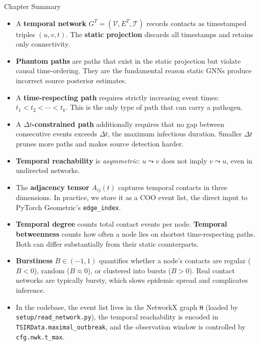 \begin{conceptbox}{Chapter Summary}
\begin{itemize}
  \item A \textbf{temporal network} $G^T = (\mathcal{V}, E^T, \mathcal{T})$ records contacts
        as timestamped triples $(u, v, t)$. The \textbf{static projection} discards all
        timestamps and retains only connectivity.
  \item \textbf{Phantom paths} are paths that exist in the static projection but violate
        causal time-ordering. They are the fundamental reason static GNNs produce incorrect
        source posterior estimates.
  \item A \textbf{time-respecting path} requires strictly increasing event times:
        $t_1 < t_2 < \cdots < t_k$. This is the only type of path that can carry a pathogen.
  \item A \textbf{$\Delta t$-constrained path} additionally requires that no gap between
        consecutive events exceeds $\Delta t$, the maximum infectious duration. Smaller
        $\Delta t$ prunes more paths and makes source detection harder.
  \item \textbf{Temporal reachability} is \textit{asymmetric}: $u \leadsto v$ does not imply
        $v \leadsto u$, even in undirected networks.
  \item The \textbf{adjacency tensor} $A_{ij}(t)$ captures temporal contacts in three
        dimensions. In practice, we store it as a COO event list, the direct input to
        PyTorch Geometric's \texttt{edge\_index}.
  \item \textbf{Temporal degree} counts total contact events per node.
        \textbf{Temporal betweenness} counts how often a node lies on shortest
        time-respecting paths. Both can differ substantially from their static counterparts.
  \item \textbf{Burstiness} $B \in (-1, 1)$ quantifies whether a node's contacts are regular
        ($B < 0$), random ($B \approx 0$), or clustered into bursts ($B > 0$). Real contact
        networks are typically bursty, which slows epidemic spread and complicates inference.
  \item In the codebase, the event list lives in the NetworkX graph \texttt{H} (loaded by
        \texttt{setup/read\_network.py}), the temporal reachability is encoded in
        \texttt{TSIRData.maximal\_outbreak}, and the observation window is controlled by
        \texttt{cfg.nwk.t\_max}.
\end{itemize}
\end{conceptbox}

